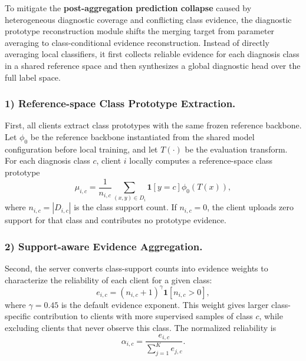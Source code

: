 \documentclass[letterpaper]{article} %
\begin{document}
To mitigate the \textbf{post-aggregation prediction collapse} caused by heterogeneous diagnostic coverage and conflicting class evidence, the diagnostic prototype reconstruction module shifts the merging target from parameter averaging to class-conditional evidence reconstruction. Instead of directly averaging local classifiers, it first collects reliable evidence for each diagnosis class in a shared reference space and then synthesizes a global diagnostic head over the full label space.

\subsubsection{1) Reference-space Class Prototype Extraction.}

First, all clients extract class prototypes with the same frozen reference backbone. Let $\phi_0$ be the reference backbone instantiated from the shared model configuration before local training, and let $T(\cdot)$ be the evaluation transform. For each diagnosis class $c$, client $i$ locally computes a reference-space class prototype
\begin{equation}
\mu_{i,c}=\frac{1}{n_{i,c}}\sum_{(x,y)\in D_i}\mathbf{1}[y=c]\phi_0(T(x)),
\end{equation}
where $n_{i,c}=|D_{i,c}|$ is the class support count. If $n_{i,c}=0$, the client uploads zero support for that class and contributes no prototype evidence.

\subsubsection{2) Support-aware Evidence Aggregation.}

Second, the server converts class-support counts into evidence weights to characterize the reliability of each client for a given class:
\begin{equation}
e_{i,c}=(n_{i,c}+1)^\gamma \mathbf{1}[n_{i,c}>0],
\end{equation}
where $\gamma=0.45$ is the default evidence exponent. This weight gives larger class-specific contribution to clients with more supervised samples of class $c$, while excluding clients that never observe this class. The normalized reliability is
\begin{equation}
\alpha_{i,c}=\frac{e_{i,c}}{\sum_{j=1}^{K} e_{j,c}}.
\end{equation}
\end{document}
